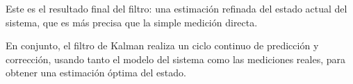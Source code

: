 \documentclass[11pt,spanish,listoffigures,listoftables]{tfgetsinf}
\begin{document}
Este es el resultado final del filtro: una estimación refinada del estado actual del sistema, que es más precisa que la simple medición directa.


En conjunto, el filtro de Kalman realiza un ciclo continuo de predicción y corrección, usando tanto el modelo del sistema como las mediciones reales, para obtener una estimación óptima del estado.



\end{document}
